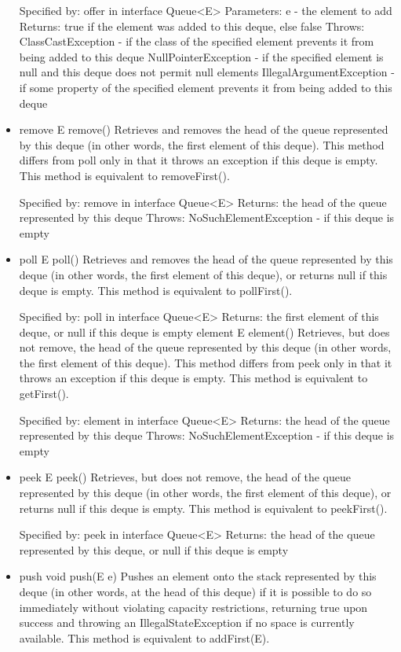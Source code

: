 \documentclass[babel]{book}
\begin{document}
\begin{itemize}
	Specified by:
	offer in interface Queue<E>
	Parameters:
	e - the element to add
	Returns:
	true if the element was added to this deque, else false
	Throws:
	ClassCastException - if the class of the specified element prevents it from being added to this deque
	NullPointerException - if the specified element is null and this deque does not permit null elements
	IllegalArgumentException - if some property of the specified element prevents it from being added to this deque
	
	\item remove
	E remove()
	Retrieves and removes the head of the queue represented by this deque (in other words, the first element of this deque). This method differs from poll only in that it throws an exception if this deque is empty.
	This method is equivalent to removeFirst().
	
	Specified by:
	remove in interface Queue<E>
	Returns:
	the head of the queue represented by this deque
	Throws:
	NoSuchElementException - if this deque is empty
	
	\item poll
	E poll()
	Retrieves and removes the head of the queue represented by this deque (in other words, the first element of this deque), or returns null if this deque is empty.
	This method is equivalent to pollFirst().
	
	Specified by:
	poll in interface Queue<E>
	Returns:
	the first element of this deque, or null if this deque is empty
	element
	E element()
	Retrieves, but does not remove, the head of the queue represented by this deque (in other words, the first element of this deque). This method differs from peek only in that it throws an exception if this deque is empty.
	This method is equivalent to getFirst().
	
	Specified by:
	element in interface Queue<E>
	Returns:
	the head of the queue represented by this deque
	Throws:
	NoSuchElementException - if this deque is empty
	
	\item peek
	E peek()
	Retrieves, but does not remove, the head of the queue represented by this deque (in other words, the first element of this deque), or returns null if this deque is empty.
	This method is equivalent to peekFirst().
	
	Specified by:
	peek in interface Queue<E>
	Returns:
	the head of the queue represented by this deque, or null if this deque is empty
	
	\item push
	void push(E e)
	Pushes an element onto the stack represented by this deque (in other words, at the head of this deque) if it is possible to do so immediately without violating capacity restrictions, returning true upon success and throwing an IllegalStateException if no space is currently available.
	This method is equivalent to addFirst(E).
	

\end{itemize}
\end{document}
